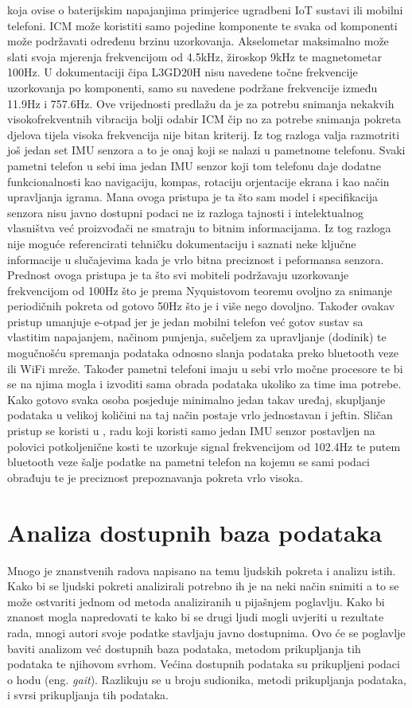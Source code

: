 \documentclass[times, utf8, diplomski]{fer}
\begin{document}
koja ovise o baterijskim napajanjima primjerice ugradbeni IoT sustavi ili mobilni telefoni. ICM može koristiti samo pojedine
komponente te svaka od komponenti može podržavati određenu brzinu uzorkovanja. Akselometar maksimalno može slati svoja mjerenja
frekvencijom od 4.5kHz, žiroskop 9kHz te magnetometar 100Hz. U dokumentaciji čipa L3GD20H nisu navedene točne frekvencije
uzorkovanja po komponenti, samo su navedene podržane frekvencije između 11.9Hz i 757.6Hz. Ove vrijednosti predlažu da je za
potrebu snimanja nekakvih visokofrekventnih vibracija bolji odabir ICM čip no za potrebe snimanja pokreta djelova tijela visoka
frekvencija nije bitan kriterij. Iz tog razloga valja razmotriti još jedan set IMU senzora a to je onaj koji se nalazi u pametnome
telefonu. Svaki pametni telefon u sebi ima jedan IMU senzor koji tom telefonu daje dodatne funkcionalnosti kao navigaciju, kompas,
rotaciju orjentacije ekrana i kao način upravljanja igrama. Mana ovoga pristupa je ta što sam model i specifikacija senzora
nisu javno dostupni podaci ne iz razloga tajnosti i intelektualnog vlasništva već proizvođači ne smatraju to bitnim informacijama.
Iz tog razloga nije moguće referencirati tehničku dokumentaciju i saznati neke ključne informacije u slučajevima kada je vrlo 
bitna preciznost i peformansa senzora. Prednost ovoga pristupa je ta što svi mobiteli podržavaju uzorkovanje frekvencijom od 
100Hz što je prema Nyquistovom teoremu ovoljno za snimanje periodičnih pokreta od gotovo 50Hz što je i više nego dovoljno.
Također ovakav pristup umanjuje e-otpad jer je jedan mobilni telefon već gotov sustav sa vlastitim napajanjem, načinom punjenja,
sučeljem za upravljanje (dodinik) te mogučnošću spremanja podataka odnosno slanja podataka preko bluetooth veze ili WiFi mreže.
Također pametni telefoni imaju u sebi vrlo močne procesore te bi se na njima mogla i izvoditi sama obrada podataka ukoliko za time
ima potrebe. Kako gotovo svaka osoba posjeduje minimalno jedan takav uređaj, skupljanje podataka u velikoj količini na taj način
postaje vrlo jednostavan i jeftin. Sličan pristup se koristi u \cite{android}, radu koji koristi samo jedan IMU senzor
postavljen na polovici potkoljenične kosti te uzorkuje signal frekvencijom od 102.4Hz te putem bluetooth veze šalje podatke na 
pametni telefon na kojemu se sami podaci obrađuju te je preciznost prepoznavanja pokreta vrlo visoka.

\section{Analiza dostupnih baza podataka}
Mnogo je znanstvenih radova napisano na temu ljudskih pokreta i analizu istih. Kako bi se ljudski pokreti analizirali potrebno ih 
je na neki način snimiti a to se može ostvariti jednom od metoda analiziranih u pijašnjem poglavlju. Kako bi znanost mogla
napredovati te kako bi se drugi ljudi mogli uvjeriti u rezultate rada, mnogi autori svoje podatke stavljaju javno dostupnima.
Ovo će se poglavlje baviti analizom već dostupnih baza podataka, metodom prikupljanja tih podataka te njihovom svrhom.
Većina dostupnih podataka su prikupljeni podaci o hodu (eng. \textit{gait}). Razlikuju se u broju sudionika, metodi prikupljanja
podataka, i svrsi prikupljanja tih podataka.
\end{document}
